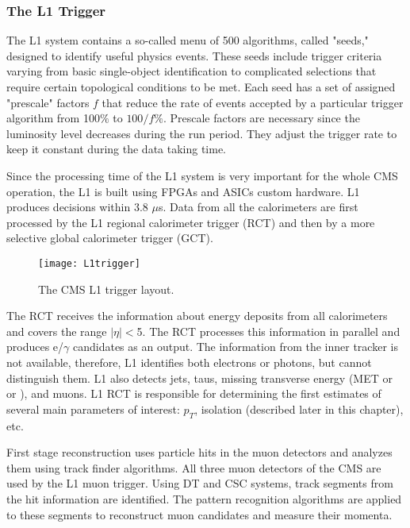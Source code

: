 \begin{normalsize}
\subsubsection{The L1 Trigger}


The L1 system \cite{CMS_TDR} contains a so-called menu of 500 algorithms, called "seeds," designed to identify useful physics events. These seeds include trigger criteria varying from basic single-object identification to complicated selections that require certain topological conditions to be met. Each seed has a set of assigned "prescale" factors $f$ that reduce the rate of events accepted by a particular trigger algorithm from 100$\%$ to $100/f\%$. Prescale factors are necessary since the luminosity level decreases during the run period. They adjust the trigger rate to keep it constant during the data taking time. 

Since the processing time of the L1 system is very important for the whole CMS operation, the L1 is built using FPGAs and ASICs custom hardware. L1 produces decisions within 3.8 $\mu$s. Data from all the calorimeters are first processed by the L1 regional calorimeter trigger (RCT) and then by a more selective global calorimeter trigger (GCT). 


 \begin{figure}[H]
  \centering
  \texttt{[image: L1trigger]}
  \caption[The CMS L1 trigger layout]{The CMS L1 trigger layout.}
  \label{L1trigger}
\end{figure}

The RCT receives the information about energy deposits from all calorimeters and covers the range $|\eta|<$5. The RCT processes this information in parallel and produces e/$\gamma$ candidates as an output. The information from the inner tracker is not available, therefore, L1 identifies both electrons or photons, but cannot distinguish them. L1 also detects jets, taus, missing transverse energy (MET or \ETslash or \PTslash), and muons. L1 RCT is responsible for determining the first estimates of several main parameters of interest: $p_T$, isolation (described later in this chapter), etc. 

First stage reconstruction uses particle hits in the muon detectors and analyzes them using track finder algorithms. All three muon detectors of the CMS are used by the L1 muon trigger. Using DT and CSC systems, track segments from the hit information are identified. The pattern recognition algorithms are applied to these segments to reconstruct muon candidates and measure their momenta. 


\end{normalsize}
